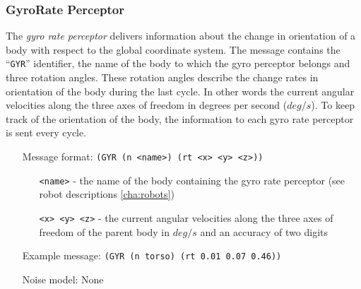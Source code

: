 \subsubsection{GyroRate Perceptor}
\label{sec:GYR}
The \emph{gyro rate perceptor} delivers information about the change in
orientation of a body with respect to the global coordinate system. The message
contains the ``\texttt{GYR}'' identifier, the name of the body to which the gyro
perceptor belongs and three rotation angles. These rotation angles describe the
change rates in orientation of the body during the last cycle. In other words
the current angular velocities along the three axes of freedom in degrees per
second ($deg/s$). To keep track of the orientation of the body, the information
to each gyro rate perceptor is sent every cycle.
\begin{itemize}
	\item[Message format:] \texttt{(GYR (n <name>) (rt <x> <y> <z>))}
		\begin{itemize}
		  \item[\texttt{<name>} -] the name of the body containing the
		  gyro rate perceptor (see robot descriptions \ref{cha:robots})
		  \item[\texttt{<x> <y> <z>} -] the current angular velocities along the
		  three axes of freedom of the parent body in $deg/s$ and an accuracy of two
		  digits
		\end{itemize}
	\item[Example message:] \texttt{(GYR (n torso) (rt 0.01 0.07 0.46))}
	\item[Noise model:] None
\end{itemize}




